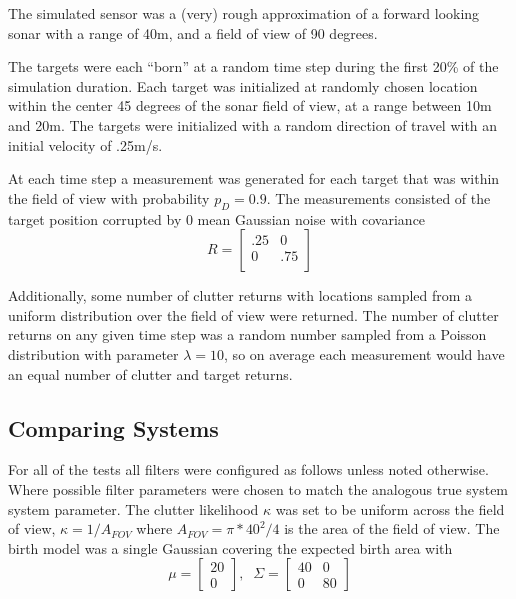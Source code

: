 \documentclass{article}
\begin{document}
The simulated sensor was a (very) rough approximation of a forward looking sonar with a range of 40m, and a field of view of 90 degrees.

The targets were each ``born'' at a random time step during the first 20\% of the simulation duration. Each target was initialized at randomly chosen location within the center 45 degrees of the sonar field of view, at a range between 10m and 20m. The targets were initialized with a random direction of travel with an initial velocity of .25m/s.

At each time step a measurement was generated for each target that was within the field of view with probability $p_D = 0.9$. The measurements consisted of the target position corrupted by 0 mean Gaussian noise with covariance
\begin{equation}
  \label{eq:R_true}
  R =
  \begin{bmatrix}
    .25 & 0\\
    0 & .75 \\
  \end{bmatrix}
\end{equation}

Additionally, some number of clutter returns with locations sampled from a uniform distribution over the field of view were returned. The number of clutter returns on any given time step was a random number sampled from a Poisson distribution with parameter $\lambda = 10$, so on average each measurement would have an equal number of clutter and target returns.

\subsection*{Comparing Systems}
For all of the tests all filters were configured as follows unless noted otherwise. Where possible filter parameters were chosen to match the analogous true system system parameter. The clutter likelihood $\kappa$ was set to be uniform across the field of view, $\kappa = 1/A_{FOV}$ where $A_{FOV} = \pi * 40^2/4$ is the area of the field of view. The birth model was a single Gaussian covering the expected birth area with
\begin{equation}
  \label{eq:target_birth_model}
  \mu =
  \begin{bmatrix}
    20 \\
    0
  \end{bmatrix},\;\;
  \Sigma =
  \begin{bmatrix}
    40 & 0 \\
    0 & 80
  \end{bmatrix}
\end{equation}
\end{document}
